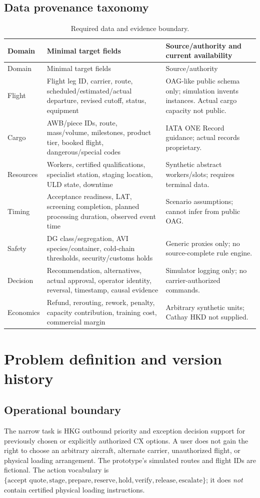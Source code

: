 \documentclass[10pt,a4paper]{article}
\theoremstyle{definition}\newtheorem{definition}[theorem]{Definition}
\theoremstyle{remark}\newtheorem{remark}[theorem]{Remark}
\newcommand{\1}{\mathbbm 1}
\begin{document}
\subsection{Data provenance taxonomy}
\begin{longtable}{@{}p{.19\linewidth}p{.40\linewidth}p{.31\linewidth}@{}}\caption{Required data and evidence boundary.}\label{tab:datamap}\\\toprule
Domain & Minimal target fields & Source/authority and current availability\\\midrule\endfirsthead\toprule Domain & Minimal target fields & Source/authority\\\midrule\endhead
Flight & Flight leg ID, carrier, route, scheduled/estimated/actual departure, revised cutoff, status, equipment & OAG-like public schema only; simulation invents instances. Actual cargo capacity not public.\\
Cargo & AWB/piece IDs, route, mass/volume, milestones, product tier, booked flight, dangerous/special codes & IATA ONE Record guidance; actual records proprietary.\\
Resources & Workers, certified qualifications, specialist station, staging location, ULD state, downtime & Synthetic abstract workers/slots; requires terminal data.\\
Timing & Acceptance readiness, LAT, screening completion, planned processing duration, observed event time & Scenario assumptions; cannot infer from public OAG.\\
Safety & DG class/segregation, AVI species/container, cold-chain thresholds, security/customs holds & Generic proxies only; no source-complete rule engine.\\
Decision & Recommendation, alternatives, actual approval, operator identity, reversal, timestamp, causal evidence & Simulator logging only; no carrier-authorized commands.\\
Economics & Refund, rerouting, rework, penalty, capacity contribution, training cost, commercial margin & Arbitrary synthetic units; Cathay HKD not supplied.\\\bottomrule
\end{longtable}

\section{Problem definition and version history}
\subsection{Operational boundary}
The narrow task is HKG outbound priority and exception decision support for previously chosen or explicitly authorized CX options. A user does not gain the right to choose an arbitrary aircraft, alternate carrier, unauthorized flight, or physical loading arrangement. The prototype's simulated routes and flight IDs are fictional. The action vocabulary is $\{\text{accept quote},\text{stage},\text{prepare},\text{reserve},\text{hold},\text{verify},\text{release},\text{escalate}\}$; it does \emph{not} contain certified physical loading instructions.
\end{document}

